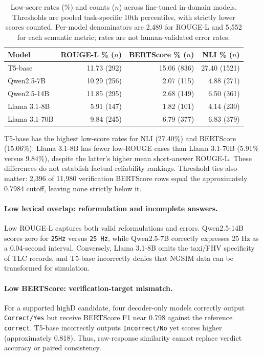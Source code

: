 \documentclass[a4paper,fleqn]{cas-sc}
\begin{document}
\begin{table}[htbp]
\centering
\small
\caption{Low-score rates (\%) and counts ($n$) across fine-tuned in-domain models. Thresholds are pooled task-specific 10th percentiles, with strictly lower scores counted. Per-model denominators are 2,489 for ROUGE-L and 5,552 for each semantic metric; rates are not human-validated error rates.}
\label{tab:low_score_audit}
\begin{tabular}{lrrr}
\toprule
Model & ROUGE-L \% ($n$) & BERTScore \% ($n$) & NLI \% ($n$) \\
\midrule
T5-base & 11.73 (292) & 15.06 (836) & 27.40 (1521) \\
Qwen2.5-7B & 10.29 (256) & 2.07 (115) & 4.88 (271) \\
Qwen2.5-14B & 11.85 (295) & 2.68 (149) & 6.50 (361) \\
Llama 3.1-8B & 5.91 (147) & 1.82 (101) & 4.14 (230) \\
Llama 3.1-70B & 9.84 (245) & 6.79 (377) & 6.83 (379) \\
\bottomrule
\end{tabular}
\end{table}

T5-base has the highest low-score rates for NLI (27.40\%) and BERTScore (15.06\%). Llama 3.1-8B has fewer low-ROUGE cases than Llama 3.1-70B (5.91\% versus 9.84\%), despite the latter's higher mean short-answer ROUGE-L. These differences do not establish factual-reliability rankings. Threshold ties also matter: 2,396 of 11,980 verification BERTScore rows equal the approximately 0.7984 cutoff, leaving none strictly below it.

\paragraph{Low lexical overlap: reformulation and incomplete answers.}
Low ROUGE-L captures both valid reformulations and errors. Qwen2.5-14B scores zero for \texttt{25Hz} versus \texttt{25 Hz}, while Qwen2.5-7B correctly expresses 25 Hz as a 0.04-second interval. Conversely, Llama 3.1-8B omits the taxi/FHV specificity of TLC records, and T5-base incorrectly denies that NGSIM data can be transformed for simulation.

\paragraph{Low BERTScore: verification-target mismatch.}
For a supported highD candidate, four decoder-only models correctly output \texttt{Correct/Yes} but receive BERTScore F1 near 0.798 against the reference \texttt{correct}. T5-base incorrectly outputs \texttt{Incorrect/No} yet scores higher (approximately 0.818). Thus, raw-response similarity cannot replace verdict accuracy or paired consistency.
\end{document}
